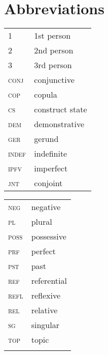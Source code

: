 \documentclass[output=paper,newtxmath,modfonts,nonflat,hidelinks]{langsci/langscibook}
\begin{document}
\section*{Abbreviations}


\begin{tabularx}{.45\textwidth}{>{\scshape}lQ}
1 & 1st person \\
2 & 2nd person   \\
3 &  3rd person  \\
conj &  conjunctive  \\
cop &   {copula} \\
cs &  construct state  \\
dem &  demonstrative  \\
ger &  gerund  \\
indef &  indefinite  \\
ipfv &  imperfect  \\
jnt &  {conjoint}  \\
\end{tabularx}
\begin{tabularx}{.45\textwidth}{>{\scshape}lQ}
neg &  negative  \\
pl &  plural  \\
poss &  possessive  \\
prf &  {perfect}  \\
pst &  past  \\
ref &  referential  \\
refl &  reflexive  \\
rel &   relative \\
sg &  singular  \\
top &   topic \\
\\
\end{tabularx}

\sloppy
\printbibliography[heading=subbibliography,notkeyword=this]
\end{document}
